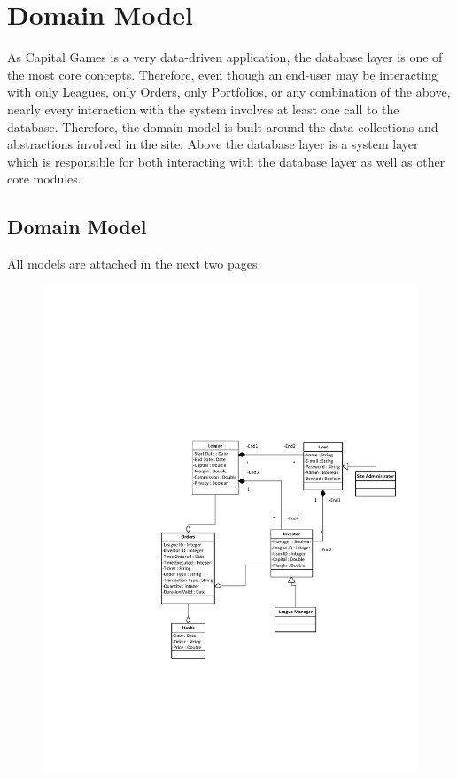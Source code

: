 \chapter{Domain Model}

As Capital Games is a very data-driven application, the database layer is
one of the most core concepts. Therefore, even though an end-user may
be interacting with only Leagues, only Orders, only Portfolios, or any
combination of the above, nearly every interaction with the system
involves at least one call to the database. Therefore, the domain model
is built around the data collections and abstractions involved in the site.
Above the database layer is a system layer which is responsible for both
interacting with the database layer as well as other core modules.

\section{Domain Model}
All models are attached in the next two pages.

\begin{figure}
\centering
\includegraphics[width=5.5in]{./img/domainModel.pdf}
\caption{ }
\end{figure}

